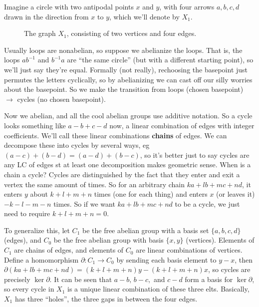 Imagine a circle with two antipodal points $x$ and $y$, with four arrows $a,b,c,d$ drawn in the direction from $x$ to $y$, which we'll denote by $X_1$.
\begin{figure}[H]
    \centering
    \caption{The graph $X_1$, consisting of two vertices and four edges.}
    \label{x1}
\end{figure}
Usually loops are nonabelian, so suppose we abelianize the loops. That is, the loops $ab^{-1}$ and $b^{-1}a$ are ``the same circle'' (but with a different starting point), so we'll just say they're equal. Formally (not really), rechoosing the basepoint just permutes the letters cyclically, so by abelianizing we can cast off our silly worries about the basepoint. So we make the transition from loops (chosen basepoint) $\longrightarrow$ cycles (no chosen basepoint).

Now we abelian, and all the cool abelian groups use additive notation. So a cycle looks something like $a-b+c-d$ now, a linear combination of edges with integer coefficients. We'll call these linear combinations \textbf{chains} of edges. We can decompose these into cycles by several ways, eg $(a-c)+(b-d)=(a-d)+(b-c)$, so it's better just to say cycles are any LC of edges st at least one decomposition makes geometric sense. When is a chain a cycle? Cycles are distinguished by the fact that they enter and exit a vertex the same amount of times. So for an arbitrary chain $ka+lb+mc+nd$, it enters $y$ about $k+l+m+n$ times (one for each thing) and enters $x$ (or leaves it) $-k-l-m-n$ times. So if we want $ka+lb+mc+nd$ to be a cycle, we just need to require $k+l+m+n=0$.

To generalize this, let $C_1$ be the free abelian group with a basis set $\{a,b,c,d\} $ (edges), and $C_0$ be the free abelian group with basis $\{x,y\} $ (vertices). Elements of $C_1$ are chains of edges, and elements of  $C_0$ are linear combinations of vertices. Define a homomorphism $\partial \colon C_1 \to C_0$ by sending each basis element to $y-x$, then $\partial (ka+lb+mc+nd)=(k+l+m+n)y-(k+l+m+n)x$, so cycles are precisely $\operatorname{ker}\partial $. It can be seen that $a-b,\,b-c,$ and $c-d$ form a basis for $\operatorname{ker}\partial $, so every cycle in $X_1$ is a unique linear combination of these three elts. Basically, $X_1$ has three ``holes'', the three gaps in between the four edges.

